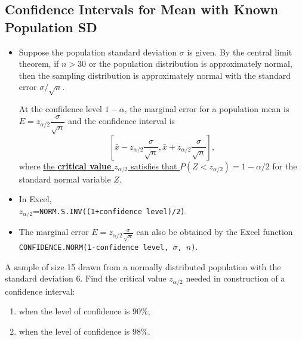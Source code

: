 \hypertarget{confidence-intervals-for-mean-with-known-population-sd}{%
\subsection{Confidence Intervals for Mean with Known Population
SD}\label{confidence-intervals-for-mean-with-known-population-sd}}

\begin{itemize}
\item
  Suppose the population standard deviation \(\sigma\) is given. By the
  central limit theorem, if \(n>30\) or the population distribution is
  approximately normal, then the sampling distribution is approximately
  normal with the standard error \(\sigma/\sqrt{n}\).

  At the confidence level \(1-\alpha\), the marginal error for a
  population mean is \(E=z_{\alpha/2}\dfrac{\sigma}{\sqrt{n}}\) and the
  confidence interval is
  \[\left[\bar{x}-z_{\alpha/2}\frac{\sigma}{\sqrt{n}}, \bar{x}+z_{\alpha/2}\frac{\sigma}{\sqrt{n}}\right],\]
  where
  \href{https://saylordotorg.github.io/text_introductory-statistics/s11-01-large-sample-estimation-of-a-p.html}{the
  \textbf{critical value} \(z_{\alpha/2}\) satisfies that
  \(P(Z<z_{\alpha/2})=1-\alpha/2\)} for the standard normal variable
  \(Z\).
\item
  In Excel,\\
  \(z_{\alpha/2}\)=\texttt{NORM.S.INV((1+confidence\ level)/2)}.
\item
  The marginal error \(E=z_{\alpha/2}\frac{\sigma}{\sqrt{n}}\) can also
  be obtained by the Excel function\\
  \texttt{CONFIDENCE.NORM(1-confidence level, $\sigma$, $n$)}.
\end{itemize}

\begin{example}

A sample of size 15 drawn from a normally distributed population with
the standard deviation 6. Find the critical value \(z_{\alpha/2}\)
needed in construction of a confidence interval:

\begin{enumerate}
\item
  when the level of confidence is 90\%;
\item
  when the level of confidence is 98\%.
\end{enumerate}

\end{example}


